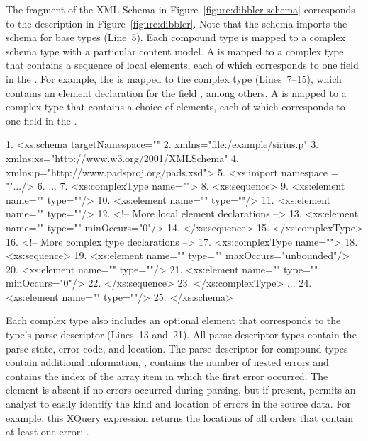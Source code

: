 The fragment of the XML Schema in Figure~\ref{figure:dibbler-schema}
corresponds to the description in Figure~\ref{figure:dibbler}.  Note
that the schema imports the schema for \pads{} base types (Line~5).
Each compound type is mapped to a complex schema type with a
particular content model.  A  is mapped to a complex type
that contains a sequence of local elements, each of which corresponds
to one field in the .  For example, the 
 is mapped to the complex type
 (Lines~7--15), which contains an element
declaration for the field , among others.  A
 is mapped to a complex type that contains a choice of
elements, each of which corresponds to one field in the .
\begin{figure*}
\begin{small}
\begin{code}
{ 1}. <xs:schema targetNamespace=""
{ 2}.            xmlns="file:/example/sirius.p"
{ 3}.            xmlns:xs="http://www.w3.org/2001/XMLSchema"
{ 4}.            xmlns:p="http://www.padsproj.org/pads.xsd">
{ 5}. <xs:import namespace = "".../>
{ 6}. ...
{ 7}. <xs:complexType name="">
{ 8}.  <xs:sequence>
{ 9}.   <xs:element name=""     type=""/>
{10}.   <xs:element name="" type=""/>
{11}.   <xs:element name=""   type=""/>
{12}.   <!-- More local element declarations -->
{13}.   <xs:element name=""            type="" minOccurs="0"/>
{14}.  </xs:sequence>
{15}. </xs:complexType>
{16}. <!-- More complex type declarations -->
{17}. <xs:complexType name="">
{18}.  <xs:sequence>
{19}.   <xs:element name=""    type="" maxOccurs="unbounded"/>
{20}.   <xs:element name="" type=""/>
{21}.   <xs:element name=""     type="" minOccurs="0"/>
{22}.  </xs:sequence>
{23}. </xs:complexType>
     ...
{24}. <xs:element name="" type=""/>
{25}. </xs:schema>
\end{code}
\end{small}
\caption{Fragment of XML Schema for \dibbler{} \pads{} description.}
\label{figure:dibbler-schema}
\end{figure*}

Each complex type also includes an optional  element that
corresponds to the type's parse descriptor (Lines~13 and~21).  All
parse-descriptor types contain the parse state, error code, and
location.  The parse-descriptor for compound types contain additional
information, \eg{},  contains the number of nested
errors and  contains the index of the array item in
which the first error occurred.  The  element is absent if no
errors occurred during parsing, but if present, permits an analyst to
easily identify the kind and location of errors in the source data.
For example, this XQuery expression returns the locations of all
orders that contain at least one error:
.

